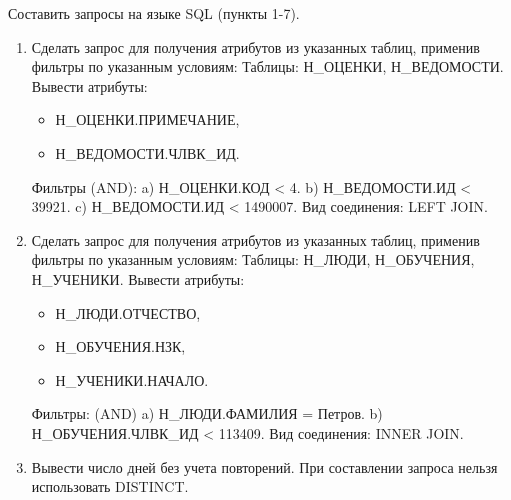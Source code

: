 \documentclass[14pt,final,oneside]{extreport}%
\begin{document}
    Составить запросы на языке SQL (пункты 1-7).
    \begin{enumerate}
        \item Сделать запрос для получения атрибутов из указанных таблиц, применив фильтры по указанным условиям: \newline
            Таблицы: Н{\_}ОЦЕНКИ, Н{\_}ВЕДОМОСТИ.  \newline
            Вывести атрибуты:
            \begin{itemize}
                \item Н{\_}ОЦЕНКИ.ПРИМЕЧАНИЕ,   
                \item Н{\_}ВЕДОМОСТИ.ЧЛВК{\_}ИД.
            \end{itemize}  
            Фильтры (AND):  \newline
            a) Н{\_}ОЦЕНКИ.КОД < 4.  \newline
            b) Н{\_}ВЕДОМОСТИ.ИД < 39921.  \newline
            c) Н{\_}ВЕДОМОСТИ.ИД < 1490007.  \newline
            Вид соединения: LEFT JOIN.  \newline

        \item Сделать запрос для получения атрибутов из указанных таблиц, применив фильтры по указанным условиям: \newline
            Таблицы: Н{\_}ЛЮДИ, Н{\_}ОБУЧЕНИЯ, Н{\_}УЧЕНИКИ. \newline
            Вывести атрибуты: 
            \begin{itemize}
                \item Н{\_}ЛЮДИ.ОТЧЕСТВО, 
                \item Н{\_}ОБУЧЕНИЯ.НЗК, 
                \item Н{\_}УЧЕНИКИ.НАЧАЛО.
            \end{itemize}
            Фильтры: (AND) \newline
            a) Н{\_}ЛЮДИ.ФАМИЛИЯ = Петров. \newline
            b) Н{\_}ОБУЧЕНИЯ.ЧЛВК{\_}ИД < 113409. \newline
            Вид соединения: INNER JOIN. \newline

        \item Вывести число дней без учета повторений. \newline
            При составлении запроса нельзя использовать DISTINCT.


\end{enumerate}
\end{document}

